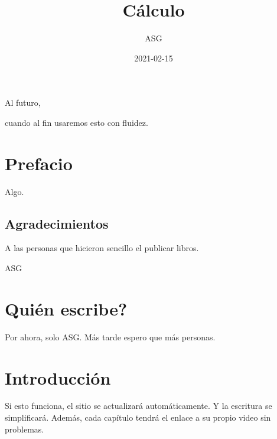 \documentclass[
]{krantz}
\title{Cálculo}
\author{ASG}
\date{2021-02-15}
\theoremstyle{definition}
\theoremstyle{definition}
\theoremstyle{definition}
\theoremstyle{definition}
\theoremstyle{remark}
\begin{document}
\maketitle


\thispagestyle{empty}

\begin{center}
Al futuro,

cuando al fin usaremos esto con fluidez.
\end{center}

\setlength{\abovedisplayskip}{-5pt}
\setlength{\abovedisplayshortskip}{-5pt}

{
\hypersetup{linkcolor=}
\setcounter{tocdepth}{2}
\tableofcontents
}
\listoftables
\listoffigures
\hypertarget{prefacio}{%
\chapter*{Prefacio}\label{prefacio}}


Algo.

\hypertarget{agradecimientos}{%
\section*{Agradecimientos}\label{agradecimientos}}


A las personas que hicieron sencillo el publicar libros.

\begin{flushright}
ASG
\end{flushright}

\hypertarget{quiuxe9n-escribe}{%
\chapter{Quién escribe?}\label{quiuxe9n-escribe}}

Por ahora, solo ASG. Más tarde espero que más personas.

\mainmatter

\hypertarget{introducciuxf3n}{%
\chapter{Introducción}\label{introducciuxf3n}}

Si esto funciona, el sitio se actualizará automáticamente. Y la escritura se simplificará. Además, cada capítulo tendrá el enlace a su propio video sin problemas.
\end{document}
